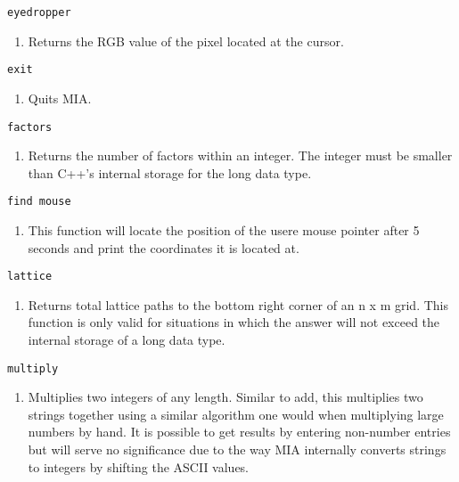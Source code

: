 \begin{lstlisting} 
eyedropper
\end{lstlisting}
\begin{enumerate}
	\item[] Returns the RGB value of the pixel located at the cursor.
\end{enumerate}

\begin{lstlisting} 
exit  
\end{lstlisting}
\begin{enumerate}
	\item[] Quits MIA. 
\end{enumerate}

\begin{lstlisting} 
factors   
\end{lstlisting}
\begin{enumerate}
	\item[] Returns the number of factors within an integer. The integer must be smaller than C++'s internal storage for the long data type.
\end{enumerate}

\begin{lstlisting} 
find mouse
\end{lstlisting}
\begin{enumerate}
	\item[] This function will locate the position of the usere mouse pointer after 5 seconds and print the coordinates it is located at.
\end{enumerate}

\begin{lstlisting} 
lattice   
\end{lstlisting}
\begin{enumerate}
	\item[] Returns total lattice paths to the bottom right corner of an n x m grid. This function is only valid for situations in which the answer will not exceed the internal storage of a long data type.
\end{enumerate}

\begin{lstlisting} 
multiply  
\end{lstlisting}
\begin{enumerate}
	\item[] Multiplies two integers of any length. Similar to add, this multiplies two strings together using a similar algorithm one would when multiplying large numbers by hand. It is possible to get results by entering non-number entries but will serve no significance due to the way MIA internally converts strings to integers by shifting the ASCII values.
\end{enumerate}

